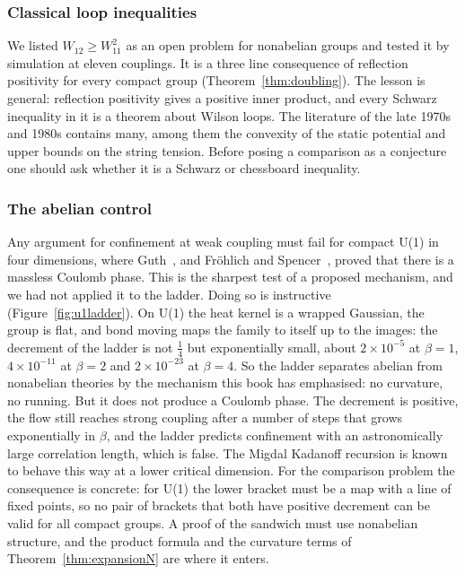 \subsubsection*{Classical loop inequalities}
We listed $W_{12}\ge W_{11}^2$ as an open problem for nonabelian groups and tested it by simulation at eleven couplings. It is a three line consequence of reflection positivity for every compact group (Theorem~\ref{thm:doubling}). The lesson is general: reflection positivity gives a positive inner product, and every Schwarz inequality in it is a theorem about Wilson loops. The literature of the late 1970s and 1980s contains many, among them the convexity of the static potential and upper bounds on the string tension. Before posing a comparison as a conjecture one should ask whether it is a Schwarz or chessboard inequality.

\subsubsection*{The abelian control}
Any argument for confinement at weak coupling must fail for compact U(1) in four dimensions, where Guth~\cite{Gu80}, and Fr\"ohlich and Spencer~\cite{FS82}, proved that there is a massless Coulomb phase. This is the sharpest test of a proposed mechanism, and we had not applied it to the ladder. Doing so is instructive (Figure~\ref{fig:u1ladder}). On U(1) the heat kernel is a wrapped Gaussian, the group is flat, and bond moving maps the family to itself up to the images: the decrement of the ladder is not $\frac14$ but exponentially small, about $2\times10^{-5}$ at $\beta=1$, $4\times10^{-11}$ at $\beta=2$ and $2\times10^{-23}$ at $\beta=4$. So the ladder separates abelian from nonabelian theories by the mechanism this book has emphasised: no curvature, no running. But it does not produce a Coulomb phase. The decrement is positive, the flow still reaches strong coupling after a number of steps that grows exponentially in $\beta$, and the ladder predicts confinement with an astronomically large correlation length, which is false. The Migdal Kadanoff recursion is known to behave this way at a lower critical dimension. For the comparison problem the consequence is concrete: for U(1) the lower bracket must be a map with a line of fixed points, so no pair of brackets that both have positive decrement can be valid for all compact groups. A proof of the sandwich must use nonabelian structure, and the product formula and the curvature terms of Theorem~\ref{thm:expansionN} are where it enters.

